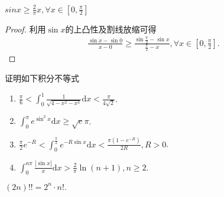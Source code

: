 \documentclass[../../main.tex]{subfiles}
\begin{document}
\begin{theorem}[Jordan不等式]\label{theorem:Jordan不等式}
$sinx\geqslant \frac{2}{\pi}x,\forall x\in [0,\frac{\pi}{2}]$
\end{theorem}
\begin{proof}
利用$\sin x$的上凸性及割线放缩可得
\begin{align*}
\frac{\sin x-\sin 0}{x-0}\geqslant \frac{\sin \frac{\pi}{2}-\sin x}{\frac{\pi}{2}-x},\forall x\in \left[ 0,\frac{\pi}{2} \right] .
\end{align*}
\end{proof}

\begin{example}
证明如下积分不等式
\begin{enumerate}
\item \(\frac{\pi}{6} < \int_{0}^{1}\frac{1}{\sqrt{4 - x^{2}-x^{3}}}\mathrm{d}x < \frac{\pi}{4\sqrt{2}}\).

\item \(\int_{0}^{\pi}e^{\sin^{2}x}\mathrm{d}x \geqslant \sqrt{e}\pi\).

\item \(\frac{\pi}{2}e^{-R} < \int_{0}^{\frac{\pi}{2}}e^{-R\sin x}\mathrm{d}x < \frac{\pi(1 - e^{-R})}{2R}, R > 0\).

\item $\int_0^{n\pi}{\frac{\left| \sin x \right|}{x}\mathrm{d}x}>\frac{2}{\pi}\ln \left( n+1 \right) ,n\geqslant 2.$
\end{enumerate}
\end{example}
\begin{remark}
$(2n)!!=2^n\cdot n!.$
\end{remark}
\end{document}
